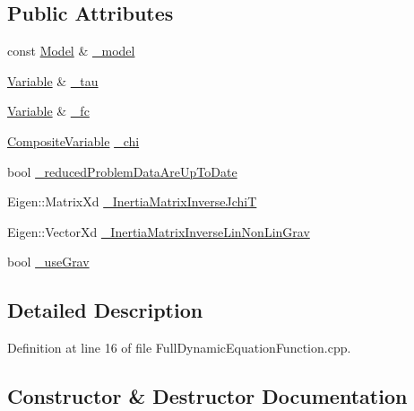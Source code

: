 \subsection*{Public Attributes}
\begin{DoxyCompactItemize}
\item 
const \hyperlink{classocra_1_1Model}{Model} \& \hyperlink{structFullDynamicEquationFunction_1_1Pimpl_a180b0f0401cc9ff23b24d974823215d9}{\+\_\+model}
\item 
\hyperlink{classocra_1_1Variable}{Variable} \& \hyperlink{structFullDynamicEquationFunction_1_1Pimpl_a952d62f65cebf67e50d0d6a091f937c4}{\+\_\+tau}
\item 
\hyperlink{classocra_1_1Variable}{Variable} \& \hyperlink{structFullDynamicEquationFunction_1_1Pimpl_ab19caa3b14b35bba6a5dc5ea490cb7b4}{\+\_\+fc}
\item 
\hyperlink{classocra_1_1CompositeVariable}{Composite\+Variable} \hyperlink{structFullDynamicEquationFunction_1_1Pimpl_a795bb07591fdf52c4b60cccfb6b3e811}{\+\_\+chi}
\item 
bool \hyperlink{structFullDynamicEquationFunction_1_1Pimpl_a2712281ce355bde0730d888d8e92b2f8}{\+\_\+reduced\+Problem\+Data\+Are\+Up\+To\+Date}
\item 
Eigen\+::\+Matrix\+Xd \hyperlink{structFullDynamicEquationFunction_1_1Pimpl_a66a532ac843e6bb0255918262e48a947}{\+\_\+\+Inertia\+Matrix\+Inverse\+JchiT}
\item 
Eigen\+::\+Vector\+Xd \hyperlink{structFullDynamicEquationFunction_1_1Pimpl_a5b5154c8b3e5725507192b9055e2b298}{\+\_\+\+Inertia\+Matrix\+Inverse\+Lin\+Non\+Lin\+Grav}
\item 
bool \hyperlink{structFullDynamicEquationFunction_1_1Pimpl_a7a8eb59e31eca20e45bd63f2975ff27b}{\+\_\+use\+Grav}
\end{DoxyCompactItemize}


\subsection{Detailed Description}


Definition at line 16 of file Full\+Dynamic\+Equation\+Function.\+cpp.



\subsection{Constructor \& Destructor Documentation}
